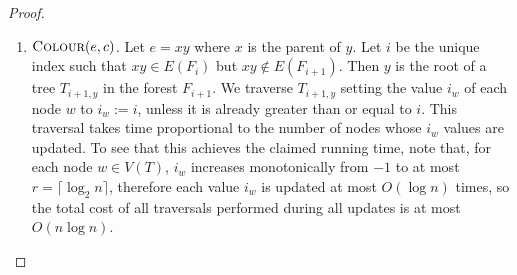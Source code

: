 \documentclass[kpfonts]{patmorin}
\begin{document}
\begin{proof}
\begin{enumerate}
    \item $\textsc{Colour}(e,c)$. Let $e=xy$ where $x$ is the parent of $y$. Let $i$ be the unique index such that $xy\in E(F_i)$ but $xy\not\in E(F_{i+1})$.  Then $y$ is the root of a tree $T_{i+1,y}$ in the forest $F_{i+1}$.  We traverse $T_{i+1,y}$ setting the value $i_w$ of each node $w$ to $i_w:=i$, unless it is already greater than or equal to $i$.  This traversal takes time proportional to the number of nodes whose $i_w$ values are updated.  To see that this achieves the claimed running time, note that, for each node $w\in V(T)$, $i_w$ increases monotonically from $-1$ to at most $r=\lceil\log_2 n\rceil$, therefore each value $i_w$ is updated at most $O(\log n)$ times, so the total cost of all traversals performed during all updates is at most $O(n\log n)$.
  \end{enumerate}


\end{proof}
\end{document}
